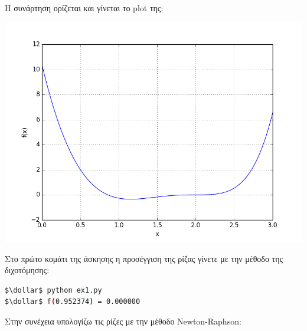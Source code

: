 \documentclass[12pt]{article}
\newcommand{\dollar}{\mbox{\textdollar}}
\begin{document}
Η συνάρτηση ορίζεται και γίνεται το plot της:


\begin{center}
\includegraphics[scale = 0.8]{plot.png}
\end{center}

Στο πρώτο κομάτι της άσκησης η προσέγγιση της ρίζας γίνετε με την μέθοδο της διχοτόμησης:



\begin{lstlisting}[language=bash, numbers=none, mathescape=true]
$\dollar$ python ex1.py
$\dollar$ f(0.952374) = 0.000000
\end{lstlisting}

Στην συνέχεια υπολογίζω τις ρίζες με την μέθοδο Newton-Raphson:
\end{document}
